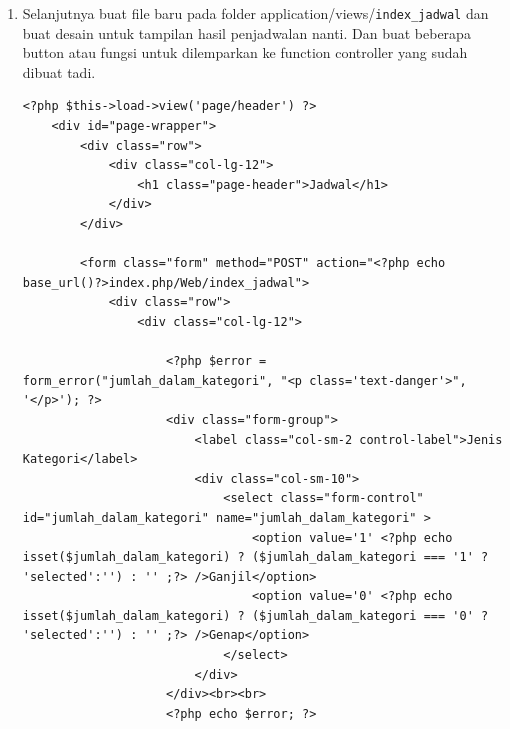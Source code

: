 \begin{enumerate}
\begin{enumerate}
\begin{lstlisting}
					$fitness = $genetik->HitungFitness();
					$genetik->Seleksi($fitness);
					$genetik->StartCrossOver();
					$fitnessAfterMutation = $genetik->Mutasi();
					for ($j = 0; $j < count($fitnessAfterMutation); $j++){
						if($fitnessAfterMutation[$j] == 1){
							$this->db->query("TRUNCATE TABLE jadwal");
							$jadwal = array(array());
							$jadwal = $genetik->GetIndividu($j);
							for($k = 0; $k < count($jadwal);$k++){
								$kode_pengampu = intval($jadwal[$k][0]);
								$kode_jam = intval($jadwal[$k][1]);
								$kode_hari = intval($jadwal[$k][2]);
								$kode_bulan_tahun = intval($jadwal[$k][3]);
								$this->db->query("INSERT INTO jadwal(kode_pengampu,kode_jam,kode_hari,kode_bulan_tahun) ".	 "VALUES($kode_pengampu,$kode_jam,$kode_hari,$kode_bulan_tahun)");
							}
							$found = true;								
						}
						if($found){break;}
					}
					if($found){break;}
				}
				if(!$found){
					echo "<script>alert('Tidak Ditemukan Solusi Optimal');history.go(-1);</script>";
				}
			}
		}else{
			$data['msg'] = validation_errors();
		}
	}	
	$data['pengampu'] = $this->MDL_Pengampu->get_pengampu_distinct();
	$data['jadwal'] = $this->MDL_Jadwal->get();
	$this->load->view('web/jadwal/index_jadwal', $data);
}
\end{lstlisting}
        \end{enumerate}
        		
    	\item Selanjutnya buat file baru pada folder application/views/\verb|index_jadwal| dan buat desain untuk tampilan hasil penjadwalan nanti. Dan buat beberapa button atau fungsi untuk dilemparkan ke function controller yang sudah dibuat tadi.
\begin{lstlisting}
<?php $this->load->view('page/header') ?>
    <div id="page-wrapper">
        <div class="row">
            <div class="col-lg-12">
                <h1 class="page-header">Jadwal</h1>
            </div>
        </div>

        <form class="form" method="POST" action="<?php echo base_url()?>index.php/Web/index_jadwal">
            <div class="row">
                <div class="col-lg-12">

                    <?php $error = form_error("jumlah_dalam_kategori", "<p class='text-danger'>", '</p>'); ?>
                    <div class="form-group">
                        <label class="col-sm-2 control-label">Jenis Kategori</label>
                        <div class="col-sm-10">
                            <select class="form-control" id="jumlah_dalam_kategori" name="jumlah_dalam_kategori" >
                                <option value='1' <?php echo isset($jumlah_dalam_kategori) ? ($jumlah_dalam_kategori === '1' ? 'selected':'') : '' ;?> />Ganjil</option>
                                <option value='0' <?php echo isset($jumlah_dalam_kategori) ? ($jumlah_dalam_kategori === '0' ? 'selected':'') : '' ;?> />Genap</option>
                            </select>
                        </div>
                    </div><br><br>
                    <?php echo $error; ?>


\end{lstlisting}
\end{enumerate}
